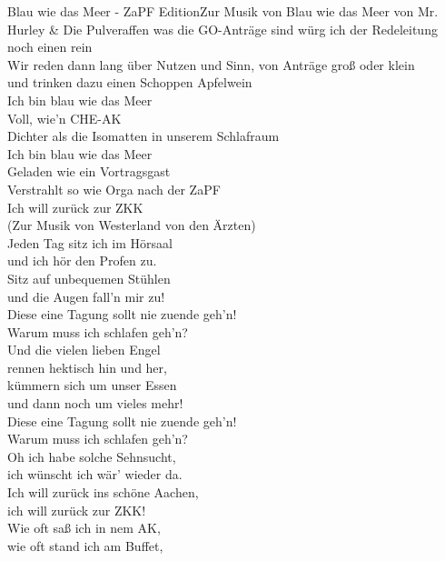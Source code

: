 \begin{lied} {Blau wie das Meer - ZaPF Edition}{Zur Musik von Blau wie das Meer von Mr. Hurley \& Die Pulveraffen}
was die GO-Anträge sind würg ich der Redeleitung noch einen rein \\
Wir reden dann lang über Nutzen und Sinn, von Anträge groß oder klein \\
und trinken dazu einen Schoppen Apfelwein \\
\vspace{1em}
Ich bin blau wie das Meer \\
Voll, wie'n CHE-AK \\
Dichter als die Isomatten in unserem Schlafraum \\
Ich bin blau wie das Meer \\
Geladen wie ein Vortragsgast \\
Verstrahlt so wie Orga nach der ZaPF \\
\vspace{1em}
Ich will zurück zur ZKK \\
(Zur Musik von Westerland von den Ärzten) \\
\vspace{1em}
Jeden Tag sitz ich im Hörsaal \\
und ich hör den Profen zu. \\
Sitz auf unbequemen Stühlen \\
und die Augen fall'n mir zu! \\
\vspace{1em}
Diese eine Tagung sollt nie zuende geh'n! \\
Warum muss ich schlafen geh'n? \\
\vspace{1em}
Und die vielen lieben Engel \\
rennen hektisch hin und her, \\
kümmern sich um unser Essen \\
und dann noch um vieles mehr! \\
\vspace{1em}
Diese eine Tagung sollt nie zuende geh'n! \\
Warum muss ich schlafen geh'n? \\
\vspace{1em}
Oh ich habe solche Sehnsucht, \\
ich wünscht ich wär' wieder da. \\
Ich will zurück ins schöne Aachen, \\
ich will zurück zur ZKK! \\
\vspace{1em}
Wie oft saß ich in nem AK, \\
wie oft stand ich am Buffet, \\

\end{lied}
